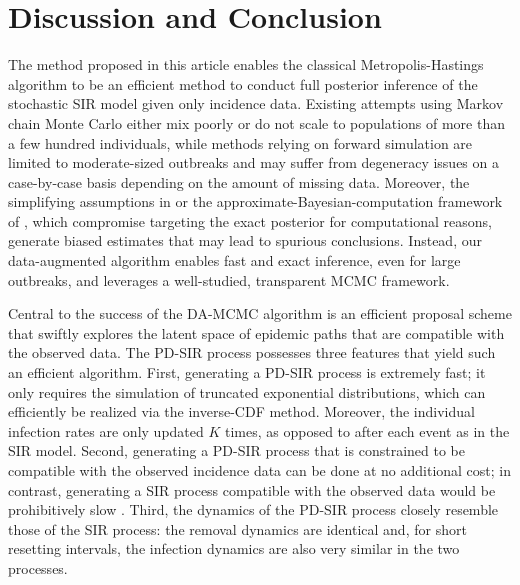 \documentclass[11pt]{article}
\begin{document}
	\section{Discussion and Conclusion}
	\label{sec:dis}
	The method proposed in this article enables the classical Metropolis-Hastings algorithm to be an efficient method to conduct full posterior inference of the stochastic SIR model given only incidence data. Existing attempts using Markov chain Monte Carlo either mix poorly or do not scale to populations of more than a few hundred individuals, while methods relying on forward simulation are limited to moderate-sized outbreaks and may suffer from degeneracy issues on a case-by-case basis depending on the amount of missing data. 	Moreover, the simplifying assumptions in \cite{Fintzi.2020} or the approximate-Bayesian-computation framework of \cite{McKinley.2018}, which compromise targeting the exact posterior for computational reasons, generate biased estimates that may lead to spurious conclusions. Instead, our data-augmented algorithm enables fast and exact inference, even for large outbreaks, and leverages a well-studied, transparent MCMC framework. %
	
	Central to the success of the DA-MCMC algorithm is an efficient proposal scheme that swiftly explores the latent space of epidemic paths that are compatible with the observed data. The PD-SIR process possesses three features that yield such an efficient algorithm. First, generating a PD-SIR process is extremely fast; it only requires the simulation of truncated exponential distributions, which can efficiently be realized via the inverse-CDF method. Moreover, the individual infection rates are only updated $K$ times, as opposed to after each event as in the SIR model. Second, generating a PD-SIR process that is constrained to be compatible with the observed incidence data can be done at no additional cost; in contrast, generating a SIR process compatible with the observed data would be prohibitively slow \cite{Hobolth.2009}. Third, the dynamics of the PD-SIR process closely resemble those of the SIR process: the removal dynamics are identical and, for short resetting intervals, the infection dynamics are also very similar in the two processes.
	
\end{document}
